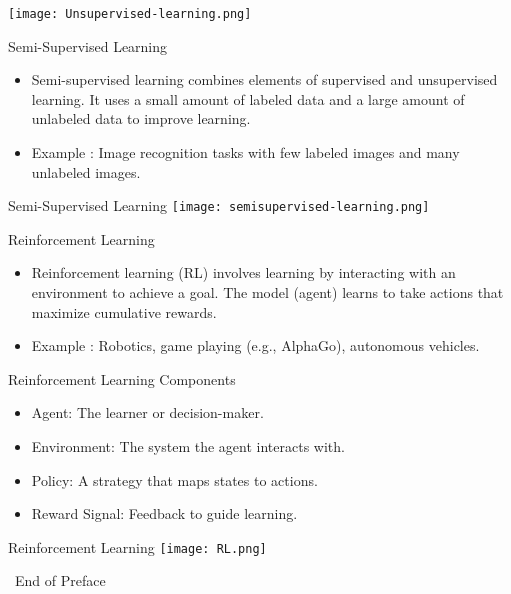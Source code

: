 \documentclass[serif, aspectratio=169]{beamer}
\begin{document}
\begin{frame}
    \centering
    \texttt{[image: Unsupervised-learning.png]}
\end{frame}


\begin{frame}{Semi-Supervised Learning}
    \begin{itemize}
        \item Semi-supervised learning combines elements of supervised and unsupervised learning. It uses a small amount of labeled data and a large amount of unlabeled data to improve learning.
        \item Example : Image recognition tasks with few labeled images and many unlabeled images.
    \end{itemize}
\end{frame}

\begin{frame}{Semi-Supervised Learning}
    \centering
    \texttt{[image: semisupervised-learning.png]}
\end{frame}

\begin{frame}{Reinforcement Learning}
    \begin{itemize}
        \item Reinforcement learning (RL) involves learning by interacting with an environment to achieve a goal. The model (agent) learns to take actions that maximize cumulative rewards.
        \item Example : Robotics, game playing (e.g., AlphaGo), autonomous vehicles.
    \end{itemize}
\end{frame}

\begin{frame}{Reinforcement Learning Components}
    \begin{itemize}
        \item Agent: The learner or decision-maker.
        \item Environment: The system the agent interacts with.
        \item Policy: A strategy that maps states to actions.
        \item Reward Signal: Feedback to guide learning.
    \end{itemize}
\end{frame}

\begin{frame}{Reinforcement Learning}
    \centering
    \texttt{[image: RL.png]}
\end{frame}

\begin{frame}
    \begin{center}
        {\Huge\ End of Preface}
    \end{center}
\end{frame}
\end{document}
